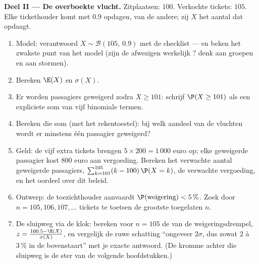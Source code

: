 \begin{problem}
\medskip
\noindent\textbf{Deel II --- De overboekte vlucht.}
Zitplaatsen: $100$. Verkochte tickets: $105$. Elke tickethouder komt met 
$0.9$ opdagen,  van de andere; zij $X$ het aantal dat opdaagt.
\begin{enumerate}[resume]
  \item Model: verantwoord $X \sim \mathcal B(105,\ 0.9)$ met de checklist ---
        en beken het zwakste punt van het model (zijn de afwezigen werkelijk
        ? denk aan groepen en aan stormen).
  \item Bereken $\E(X)$ en $\sigma(X)$.
  \item Er worden passagiers geweigerd zodra $X \geq 101$: schrijf
        $\P(X \geq 101)$ als een expliciete som van vijf binomiale termen.
  \item Bereken die som (met het rekentoestel): bij welk aandeel van de
        vluchten wordt er minstens één passagier geweigerd?
  \item Geld: de vijf extra tickets brengen $5 \times 200 = 1\,000$ euro op;
        elke geweigerde passagier kost $800$ euro aan vergoeding. Bereken het
        verwachte aantal geweigerde passagiers,
        $\sum_{k=101}^{105} (k - 100)\,\P(X = k)$, de verwachte vergoeding, en
        het oordeel over dit beleid.
  \item Ontwerp: de toezichthouder aanvaardt $\P(\text{weigering}) < 5\,\%$.
        Zoek door $n = 105, 106, 107, \dots$ tickets te toetsen de grootste
        toegelaten $n$.
  \item De sluipweg via de klok: bereken voor $n = 105$ de  van de
        weigeringsdrempel, $z = \frac{100.5 - \E(X)}{\sigma(X)}$, en vergelijk
        de ruwe schatting ``ongeveer $2\sigma$, dus zowat $2$ à $3\,\%$ in de
        bovenstaart'' met je exacte antwoord. (De kromme achter die sluipweg
        is de ster van de volgende hoofdstukken.)
\end{enumerate}


\end{problem}
